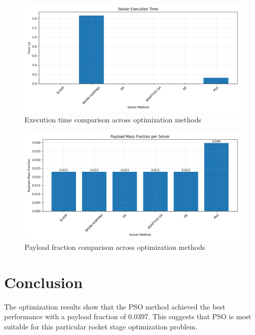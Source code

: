 \documentclass{article}
\begin{document}
\begin{figure}[H]
\centering
\includegraphics[width=\textwidth]{execution_time.png}
\caption{Execution time comparison across optimization methods}
\label{fig:execution-time}
\end{figure}

\begin{figure}[H]
\centering
\includegraphics[width=\textwidth]{payload_fraction.png}
\caption{Payload fraction comparison across optimization methods}
\label{fig:payload-fraction}
\end{figure}

\section{Conclusion}
The optimization results show that the PSO method achieved the best performance with a payload fraction of 0.0397. This suggests that PSO is most suitable for this particular rocket stage optimization problem.
\end{document}
